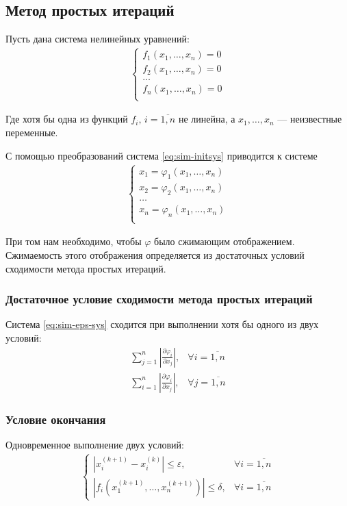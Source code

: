 \subsection{Метод простых итераций}
Пусть дана система нелинейных уравнений:
\begin{align}\label{eq:sim-initsys}
	\begin{cases}
		f_1(x_1,\dots,x_n) = 0 \\
		f_2(x_1,\dots,x_n) = 0 \\
		\dots                  \\
		f_n(x_1,\dots,x_n) = 0 \\
	\end{cases}
\end{align}

Где хотя бы одна из функций \(f_i,\, i=\overline{1,n}\) не линейна, а \(x_1,\dots,x_n\) --- неизвестные переменные.

С помощью преобразований система \cref{eq:sim-initsys} приводится к системе
\begin{align}\label{eq:sim-eps-sys}
	\begin{cases}
		x_1 = \varphi_1(x_1,\dots,x_n) \\
		x_2 = \varphi_2(x_1,\dots,x_n) \\
		\dots                          \\
		x_n = \varphi_n(x_1,\dots,x_n) \\
	\end{cases}
\end{align}

При том нам необходимо, чтобы \(\varphi\) было сжимающим отображением. Сжимаемость этого отображения определяется из достаточных условий сходимости метода простых итераций.

\subsubsection*{Достаточное условие сходимости метода простых итераций}
Система \cref{eq:sim-eps-sys} сходится при выполнении хотя бы одного из двух условий:
\begin{align}
	\sum_{j=1}^n\left| \frac{\partial \varphi_i}{\partial x_j} \right|, & \forall i = \overline{1, n} \\
	\sum_{i=1}^n\left| \frac{\partial \varphi_i}{\partial x_j} \right|, & \forall j = \overline{1, n}
\end{align}

\subsubsection*{Условие окончания}
Одновременное выполнение двух условий:
\begin{align}
	\begin{cases}
		|x_i^{(k+1)} - x_i^{(k)}| \leq \varepsilon,       & \forall i = \overline{1,n} \\
		|f_i(x_1^{(k+1)},\dots,x_n^{(k+1)})| \leq \delta, & \forall i = \overline{1,n}
	\end{cases}
\end{align}

